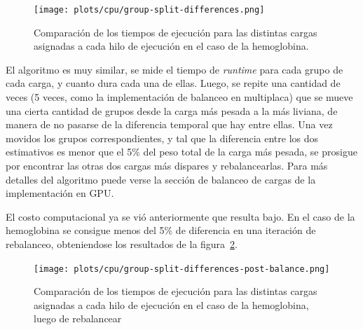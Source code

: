 \begin{figure}[htbp]
   \centering
   \texttt{[image: plots/cpu/group-split-differences.png]}
   \caption{Comparaci\'on de los tiempos de ejecuci\'on para las distintas
   cargas asignadas a cada hilo de ejecuci\'on en el caso de la hemoglobina.}
   \label{fig:lio-imbalance-between-loads}
\end{figure}

El algoritmo es muy similar, se mide el tiempo de \textit{runtime} para cada
grupo de cada carga, y cuanto dura cada una de ellas. Luego, se repite una
cantidad de veces (5 veces, como la implementaci\'on de balanceo en multiplaca)
que se mueve una cierta cantidad de grupos desde la carga m\'as pesada a la
m\'as liviana, de manera de no pasarse de la diferencia temporal que hay entre
ellas. Una vez movidos los grupos correspondientes, y tal que la diferencia
entre los dos estimativos es menor que el 5\% del peso total de la carga m\'as
pesada, se prosigue por encontrar las otras dos cargas m\'as dispares y
rebalancearlas. Para m\'as detalles del algoritmo puede verse la secci\'on
de balanceo de cargas de la implementaci\'on en GPU.

El costo computacional ya se vi\'o anteriormente que resulta bajo. En el caso
de la hemoglobina se consigue menos del 5\% de diferencia en una iteraci\'on
de rebalanceo, obteniendose los resultados de la figura~\ref{fig:lio-imbalance-fixed}.

\begin{figure}[htbp]
   \centering
   \texttt{[image: plots/cpu/group-split-differences-post-balance.png]}
   \caption{Comparaci\'on de los tiempos de ejecuci\'on para las distintas
   cargas asignadas a cada hilo de ejecuci\'on en el caso de la hemoglobina,
   luego de rebalancear}
   \label{fig:lio-imbalance-fixed}
\end{figure}
